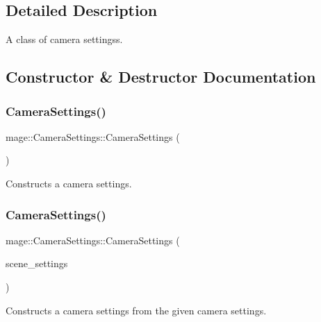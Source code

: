 \subsection{Detailed Description}
A class of camera settingss. 

\subsection{Constructor \& Destructor Documentation}
\hypertarget{classmage_1_1_camera_settings_a08e24d87d4441af780a3f34504a41118}{}\label{classmage_1_1_camera_settings_a08e24d87d4441af780a3f34504a41118} 
\subsubsection{\texorpdfstring{Camera\+Settings()}{CameraSettings()}\hspace{0.1cm}{\footnotesize\ttfamily [1/3]}}
{\footnotesize\ttfamily mage\+::\+Camera\+Settings\+::\+Camera\+Settings (\begin{DoxyParamCaption}{ }\end{DoxyParamCaption})}

Constructs a camera settings. \hypertarget{classmage_1_1_camera_settings_a9dc529822866523b62b7d9388e04c5fd}{}\label{classmage_1_1_camera_settings_a9dc529822866523b62b7d9388e04c5fd} 
\subsubsection{\texorpdfstring{Camera\+Settings()}{CameraSettings()}\hspace{0.1cm}{\footnotesize\ttfamily [2/3]}}
{\footnotesize\ttfamily mage\+::\+Camera\+Settings\+::\+Camera\+Settings (\begin{DoxyParamCaption}\item[{const \hyperlink{classmage_1_1_camera_settings}{Camera\+Settings} \&}]{scene\+\_\+settings }\end{DoxyParamCaption})\hspace{0.3cm}{\ttfamily [default]}}

Constructs a camera settings from the given camera settings.


